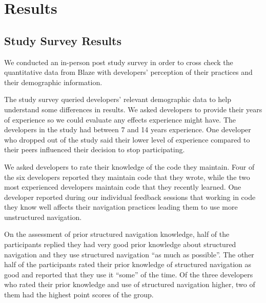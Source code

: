 \documentclass{sig-alternate}
\begin{document}
\section{Results}

\subsection{Study Survey Results}

We conducted an in-person post study survey in order to cross check the quantitative data from Blaze with developers' perception of their practices and their demographic information.

The study survey queried developers' relevant demographic data to help understand some differences in results.  We asked developers to provide their years of experience so we could evaluate any effects experience might have.  The developers in the study had between 7 and 14 years experience.  One developer who dropped out of the study said their lower level of experience compared to their peers influenced their decision to stop participating.  

We asked developers to rate their knowledge of the code they maintain.  Four of the six developers reported they maintain code that they wrote, while the two most experienced developers maintain code that they recently learned.  One developer reported during our individual feedback sessions that working in code they know well affects their navigation practices leading them to use more unstructured navigation.

On the assessment of prior structured navigation knowledge, half of the participants replied they had very good prior knowledge about structured navigation and they use structured navigation ``as much as possible''.  The other half of the participants rated their prior knowledge of structured navigation as good and reported that they use it ``some'' of the time. Of the three developers who rated their prior knowledge and use of structured navigation higher, two of them had the highest point scores of the group.
\end{document}
